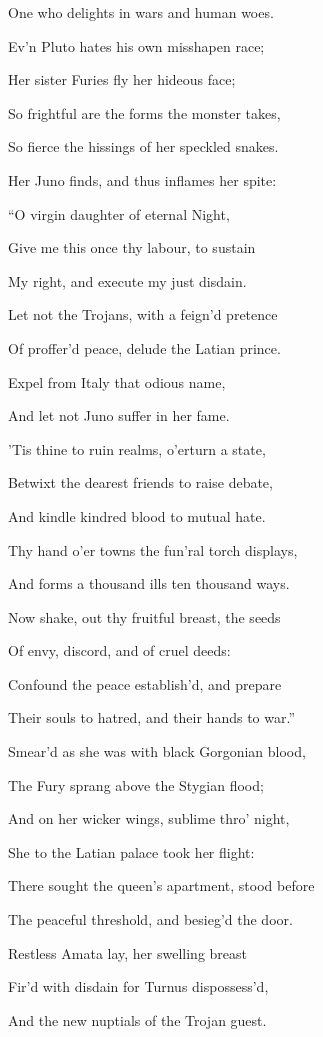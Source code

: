 One who delights in wars and human woes.

Ev’n Pluto hates his own misshapen race;

Her sister Furies fly her hideous face;

So frightful are the forms the monster takes,

So fierce the hissings of her speckled snakes.

Her Juno finds, and thus inflames her spite:

“O virgin daughter of eternal Night,

Give me this once thy labour, to sustain

My right, and execute my just disdain.

Let not the Trojans, with a feign’d pretence

Of proffer’d peace, delude the Latian prince.

Expel from Italy that odious name,

And let not Juno suffer in her fame.

’Tis thine to ruin realms, o’erturn a state,

Betwixt the dearest friends to raise debate,

And kindle kindred blood to mutual hate.

Thy hand o’er towns the fun’ral torch displays,

And forms a thousand ills ten thousand ways.

Now shake, out thy fruitful breast, the seeds

Of envy, discord, and of cruel deeds:

Confound the peace establish’d, and prepare

Their souls to hatred, and their hands to war.”

Smear’d as she was with black Gorgonian blood,

The Fury sprang above the Stygian flood;

And on her wicker wings, sublime thro’ night,

She to the Latian palace took her flight:

There sought the queen’s apartment, stood before

The peaceful threshold, and besieg’d the door.

Restless Amata lay, her swelling breast

Fir’d with disdain for Turnus dispossess’d,

And the new nuptials of the Trojan guest.

